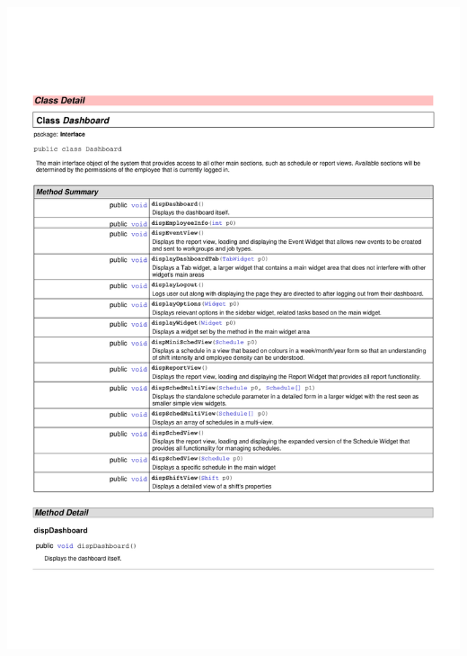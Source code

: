 \documentclass[letterpaper,12pt]{report}
\begin{document}
\includegraphics[scale=0.9,trim=20mm 30mm 25mm 25mm]{externals/InterfaceDataDictionary13.pdf}
\pagebreak
\end{document}
